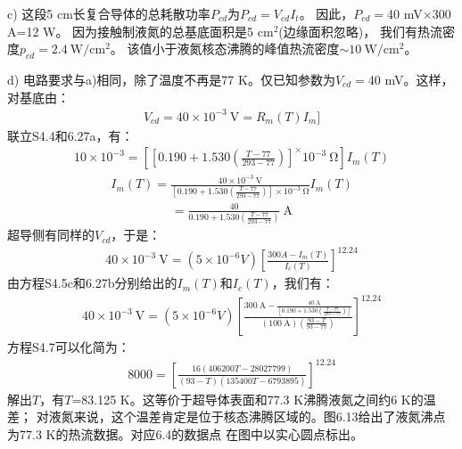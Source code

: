 c) 这段5 cm长复合导体的总耗散功率$P_{cd}$为$P_{cd}=V_{cd}I_t$。
因此，$P_{cd}=$40 mV$\times$300 A=12 W。
因为接触制液氮的总基底面积是5 $\mathrm{cm^2}$(边缘面积忽略)，
我们有热流密度$p_{cd}=2.4\ \mathrm{W/cm^2}$。
该值小于液氮核态沸腾的峰值热流密度$\sim 10\ \mathrm{W/cm^2}$。

d) 电路要求与a)相同，除了温度不再是77 K。仅已知参数为$V_{cd}=$40 mV。这样，对基底由：
\begin{align*}%
V_{cd}=40\times10^{-3}\ \mathrm{V}=R_m(T)I_m ]\tag{S4.4}
\end{align*}
联立S4.4和6.27a，有：
\begin{align*}%
10\times10^{-3}=[{[0.190+1.530(\frac{T-77}{293-77})]^\times10^{-3}\ \mathrm{\Omega}}]I_m(T) \tag{S4.5a}
\end{align*}
\begin{align*}%
I_m(T)=\frac{40\times10^{-3}\ \mathrm{V}}{[0.190+1.530(\frac{T-77}{293-77})]\times10^{-3}\ \mathrm{\Omega}}I_m(T) \tag{S4.5b}
\end{align*}
\begin{align*}%
=\frac{40}{0.190+1.530(\frac{T-77}{293-77})}\ \mathrm{A} \tag{S4.5c}
\end{align*}
超导侧有同样的$V_{cd}$，于是：
\begin{align*}%
40\times10^{-3}\ \mathrm{V}=(5\times10^{-6}V)[\frac{300A-I_m(T)}{I_c(T)}]^{12.24} \tag{S4.6}
\end{align*}
由方程S4.5c和6.27b分别给出的$I_m(T)$和$I_c(T)$，我们有：
\begin{align*}%
40\times10^{-3}\ \mathrm{V}=(5\times10^{-6}V)[\frac{300\ \mathrm{A}-\frac{40\ \mathrm{A}}{[0.190+1.530(\frac{T-77}{293-77})]}}{(100\ \mathrm{A})(\frac{93-T}{93-77})}]^{12.24}\tag{S4.7}
\end{align*}
方程S4.7可以化简为：
\begin{align*}%
8000=[\frac{16(406200T-28027799)}{(93-T)(135400T-6793895)}]^{12.24} \tag{S4.8}
\end{align*}
解出$T$，有$T$=83.125 K。这等价于超导体表面和77.3 K沸腾液氮之间约6 K的温差；
对液氮来说，这个温差肯定是位于核态沸腾区域的。图6.13给出了液氮沸点为77.3 K的热流数据。对应6.4的数据点
在图中以实心圆点标出。
